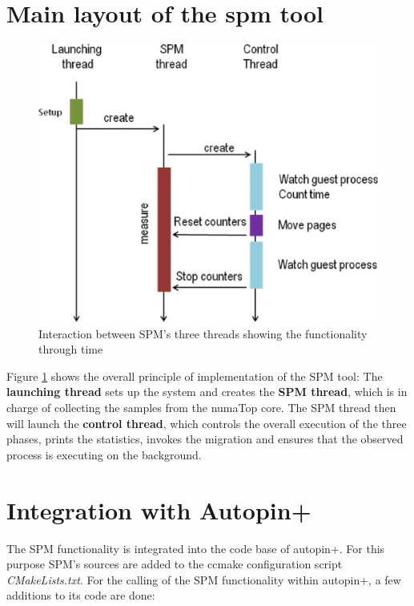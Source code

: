 \section{Main layout of the spm tool }\label{section:main-layout}

\begin{figure}
	\centering
		\includegraphics[width=.9\textwidth]{figures/sequence.eps}
		\caption[Timing and threads in the execution of the SPM tool]{Interaction between SPM's three threads showing the functionality through time}
		\label{fig:sol-seq}
\end{figure}

Figure \ref{fig:sol-seq} shows the overall principle of implementation of the SPM tool: The \textbf{launching thread} sets up the system and creates the \textbf{SPM thread}, which is in charge of collecting the samples from the numaTop core. The SPM thread then will launch the \textbf{control thread}, which controls the overall execution of the three phases, prints the statistics, invokes the migration and ensures that the observed process is executing on the background.

\section{Integration with Autopin+}\label{section:apinplu-intgr}

The SPM functionality is integrated into the code base of autopin+. For this purpose SPM’s sources are added to the ccmake configuration script \textit{CMakeLists.txt}. For the calling of the SPM functionality within autopin+, a few additions to its code are done:

